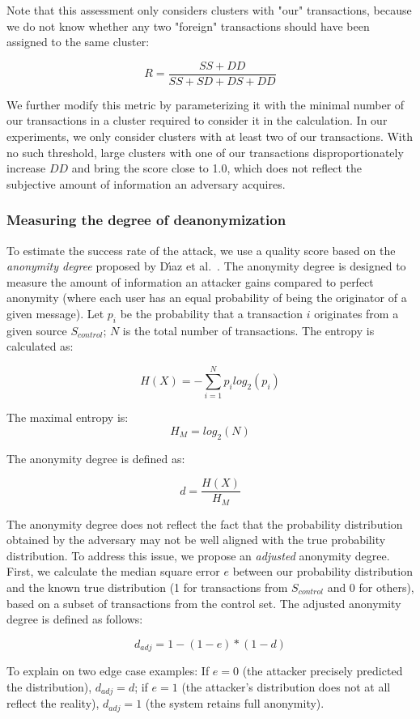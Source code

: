 Note that this assessment only considers clusters with "our" transactions, because we do not know whether any two "foreign" transactions should have been assigned to the same cluster:

\[
R = \frac{SS + DD}{SS + SD + DS + DD}
\]

We further modify this metric by parameterizing it with the minimal number of our transactions in a cluster required to consider it in the calculation.
In our experiments, we only consider clusters with at least two of our transactions.
With no such threshold, large clusters with one of our transactions disproportionately increase $DD$ and bring the score close to 1.0, which does not reflect the subjective amount of information an adversary acquires.

\subsubsection{Measuring the degree of deanonymization}

To estimate the success rate of the attack, we use a quality score based on the \textit{anonymity degree} proposed by D{\'{\i}}az et al.~\cite{Diaz2002}.
The anonymity degree is designed to measure the amount of information an attacker gains compared to perfect anonymity (where each user has an equal probability of being the originator of a given message).
Let $p_i$ be the probability that a transaction $i$ originates from a given source $S_{control}$; $N$ is the total number of transactions.
The entropy is calculated as:

\[
H(X) = -\sum_{i=1}^N p_i log_2(p_i)
\]

The maximal entropy is:
\[
H_M = log_2(N)
\]

The anonymity degree is defined as:

\[
d = \frac{H(X)}{H_M}
\]

The anonymity degree does not reflect the fact that the probability distribution obtained by the adversary may not be well aligned with the true probability distribution.
To address this issue, we propose an \textit{adjusted} anonymity degree.
First, we calculate the median square error $e$ between our probability distribution and the known true distribution (1 for transactions from $S_{control}$ and 0 for others), based on a subset of transactions from the control set.
The adjusted anonymity degree is defined as follows:

\[
d_{adj} = 1 - (1 - e) * (1 - d)
\]

To explain on two edge case examples: If $e = 0$ (the attacker precisely predicted the distribution), $d_{adj} = d$; if $e = 1$ (the attacker's distribution does not at all reflect the reality), $d_{adj} = 1$ (the system retains full anonymity).

